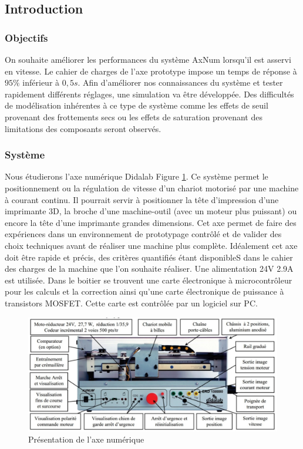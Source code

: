\graphicspath{{/Users/emiliendurif/Documents/prepa/sujets/TP_simulation/axenum/}}
\subsection{Introduction}
\subsubsection{Objectifs}

On souhaite améliorer les performances du système AxNum lorsqu'il est asservi en vitesse. Le cahier de charges de l'axe prototype impose un temps de réponse à $95\%$ inférieur à $0,5s$. Afin d'améliorer nos connaissances du système et tester rapidement différents réglages, une simulation va être développée. Des difficultés de modélisation inhérentes à ce type de système comme les effets de seuil provenant des frottements secs ou les effets de saturation provenant des limitations des composants seront observés.

\subsubsection{Système}

Nous étudierons l'axe numérique Didalab Figure \ref{Figure1}. Ce système permet le positionnement ou la régulation de vitesse d'un chariot motorisé par une machine à courant continu. Il pourrait servir à positionner la tête d'impression d'une imprimante 3D, la broche d'une machine-outil (avec un moteur plus puissant) ou encore la tête d'une imprimante grandes dimensions. Cet axe permet de faire des expériences dans un environnement de prototypage contrôlé et de valider des choix techniques avant de réaliser une machine plus complète. Idéalement cet axe doit être rapide et précis, des critères quantifiés étant disponibleS dans le cahier des charges de la machine que l'on souhaite réaliser.
Une alimentation 24V 2.9A est utilisée. Dans le boitier se trouvent une carte électronique à microcontrôleur pour les calculs et la correction ainsi qu'une carte électronique de puissance à transistors MOSFET. Cette carte est contrôlée par un logiciel sur PC.

\begin{figure}[!htb]
\begin{center}
\includegraphics[width=1.0\textwidth]{images/figure1.png}
\caption{Présentation de l'axe numérique \label{Figure1}}
\end{center}
\end{figure}

